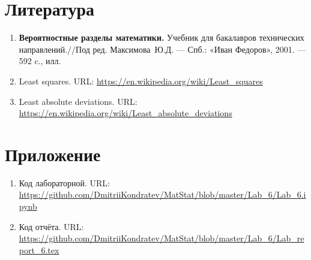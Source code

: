 \documentclass[12pt,a4paper]{article}
\begin{document}
	\section{Литература}
	\begin{enumerate}
		\item \label{Book_1} \textbf{Вероятностные разделы математики.} Учебник для бакалавров технических направлений.//Под ред. Максимова~Ю.Д. --- Спб.: «Иван Федоров», 2001. --- 592 c., илл.
		
		\item Least squares. URL: \url{https://en.wikipedia.org/wiki/Least_squares}
		
		\item Least absolute deviations. URL: \url{https://en.wikipedia.org/wiki/Least_absolute_deviations}
	\end{enumerate}

	\section{Приложение}
	\begin{enumerate}
		\item Код лабораторной. URL: \url{https://github.com/DmitriiKondratev/MatStat/blob/master/Lab_6/Lab_6.ipynb}
		
		\item Код отчёта. URL: \url{https://github.com/DmitriiKondratev/MatStat/blob/master/Lab_6/Lab_report_6.tex}
	\end{enumerate}
\end{document}
